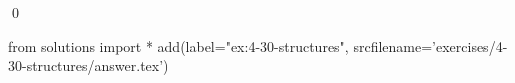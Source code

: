 
\begin{ex}
  \label{ex:4-30-structures}
  
  \qed
\end{ex}
\begin{python0}
from solutions import *
add(label="ex:4-30-structures",
    srcfilename='exercises/4-30-structures/answer.tex')
\end{python0}
